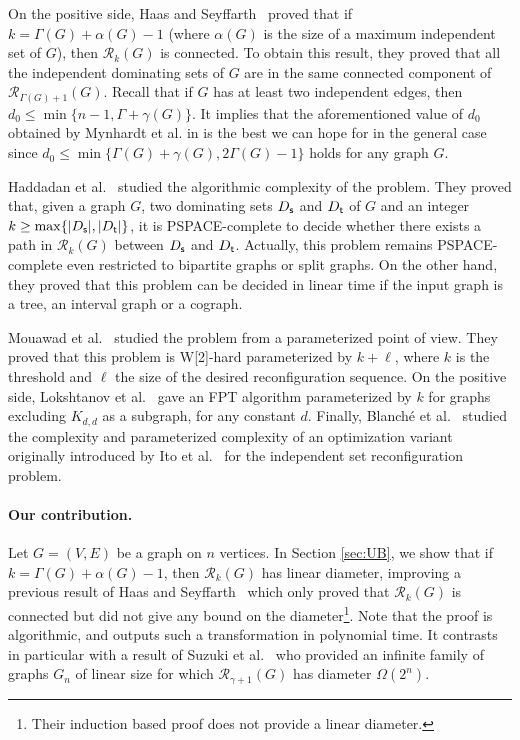 \documentclass[10pt]{article}
\newcommand{\source}{{\sf s}}
\newcommand{\target}{{\sf t}}
\begin{document}
On the positive side, Haas and Seyffarth~\cite{Haas17} proved that if $k = \Gamma(G)+\alpha(G)-1$ (where $\alpha(G)$ is the size of a maximum independent set of $G$), then $\mathcal{R}_k(G)$ is connected. To obtain this result, they proved that all the independent dominating sets of $G$ are in the same connected component of $\mathcal{R}_{\Gamma(G)+1}(G)$. Recall that if $G$ has at least two independent edges, then $d_0 \le \min\{n-1, \Gamma+\gamma(G)\}$. It implies that the aforementioned value of $d_0$ obtained by Mynhardt et al. in \cite{Mynhardt19} is the best we can hope for in the general case since $d_0 \le \min\{\Gamma(G)+\gamma(G), 2\Gamma(G)-1\}$ holds for any graph $G$. 

Haddadan et al.~\cite{Haddadan16} studied the algorithmic complexity of the problem. They proved that, given a graph $G$, two dominating sets $D_\source$ and $D_\target$ of $G$ and an integer $k \ge \max\{|D_\source|,|D_\target|\}$, it is PSPACE-complete to decide whether there exists a path in $\mathcal{R}_k(G)$ between $D_\source$ and $D_\target$. Actually, this problem remains PSPACE-complete even restricted to bipartite graphs or split graphs. On the other hand, they proved that this problem can be decided in linear time if the input graph is a tree, an interval graph or a cograph. 

\medskip
Mouawad et al.~\cite{Mouawad16} studied the problem from a parameterized point of view. They proved that this problem is W[2]-hard parameterized by $k+\ell$, where $k$ is the threshold and $\ell$ the size of the desired reconfiguration sequence. On the positive side, Lokshtanov et al.~\cite{Lokshtanov18} gave an FPT algorithm parameterized by $k$ for graphs excluding $K_{d,d}$ as a subgraph, for any constant $d$. Finally, Blanch\'e et al.~\cite{Blanche20} studied the complexity and parameterized complexity of an optimization variant originally introduced by Ito et al.~\cite{Ito19} for the independent set reconfiguration problem. 


\paragraph{Our contribution.}
Let $G=(V,E)$ be a graph on $n$ vertices.
In Section \ref{sec:UB}, we show that if $k=\Gamma(G)+\alpha(G)-1$, then $\mathcal{R}_k(G)$ has linear diameter, improving a previous result of Haas and Seyffarth~\cite{Haas17} which only proved that $\mathcal{R}_k(G)$ is connected but did not give any bound on the diameter\footnote{Their induction based proof does not provide a linear diameter.}. Note that the proof is algorithmic, and outputs such a transformation in polynomial time.
It contrasts in particular with a result of Suzuki et al.~\cite{SuzukiMN16} who provided an infinite family of graphs $G_n$ of linear size for which $\mathcal{R}_{\gamma+1}(G)$ has diameter $\Omega(2^n)$. 
\end{document}
